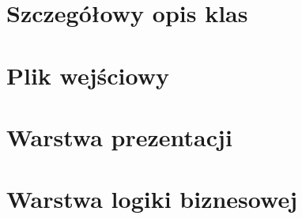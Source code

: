 \section{Szczegółowy opis klas}
\section{Plik wejściowy}
\section{Warstwa prezentacji}
\section{Warstwa logiki biznesowej}
